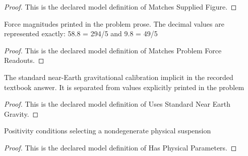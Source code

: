 \begin{proof}
  This is the declared model definition of Matches Supplied Figure.
\end{proof}
\begin{definition}
  \label{def:physics:phyx-mini-0757:phyxminiproblems-problemphyxmini0757-matchesproblemforcereadouts}
  Force magnitudes printed in the problem prose. The decimal values are represented exactly: 58.8 = 294/5 and 9.8 = 49/5
\end{definition}
\begin{proof}
  This is the declared model definition of Matches Problem Force Readouts.
\end{proof}
\begin{definition}
  \label{def:physics:phyx-mini-0757:phyxminiproblems-problemphyxmini0757-usesstandardnearearthgravity}
  The standard near-Earth gravitational calibration implicit in the recorded textbook answer. It is separated from values explicitly printed in the problem
\end{definition}
\begin{proof}
  This is the declared model definition of Uses Standard Near Earth Gravity.
\end{proof}
\begin{definition}
  \label{def:physics:phyx-mini-0757:phyxminiproblems-problemphyxmini0757-hasphysicalparameters}
  Positivity conditions selecting a nondegenerate physical suspension
\end{definition}
\begin{proof}
  This is the declared model definition of Has Physical Parameters.
\end{proof}
